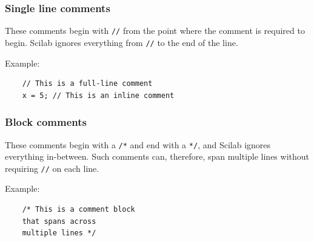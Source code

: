 		\subsubsection{Single line comments}
			These comments begin with \verb|//| from the point where the comment is required to begin. Scilab ignores everything from \verb|//| to the end of the line.
			
			Example:
			\begin{verbatim}
	// This is a full-line comment
	x = 5; // This is an inline comment
			\end{verbatim}
		
		\subsubsection{Block comments}
			These comments begin with a \verb|/*| and end with a \verb|*/|, and Scilab ignores everything in-between. Such comments can, therefore, span multiple lines without requiring \verb|//| on each line.
			
			Example:
			\begin{verbatim}
	/* This is a comment block
	that spans across
	multiple lines */
			\end{verbatim}
	
